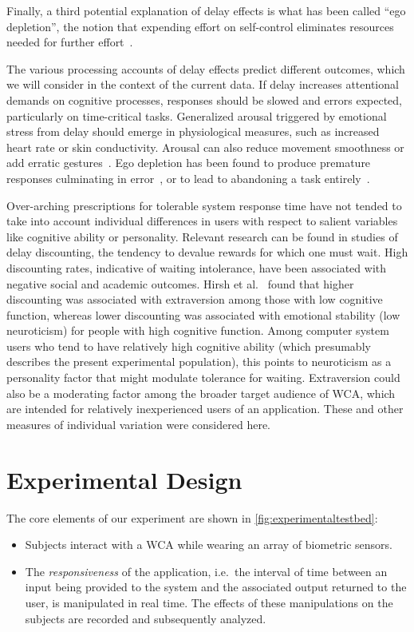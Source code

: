 Finally, a third potential explanation of delay effects is what has been called ``ego depletion'', the notion that expending effort on self-control eliminates resources needed for further effort~\cite{baumeister74tice,lin2020strong}.

The various processing accounts of delay effects predict different outcomes, which we will consider in the context of the current data.
If delay increases attentional demands on cognitive processes, responses should be slowed and errors expected, particularly on time-critical tasks.
Generalized arousal triggered by emotional stress from delay should emerge in physiological measures, such as increased heart rate or skin conductivity.
Arousal can also reduce movement smoothness or add erratic gestures~\cite{pijpers2003anxiety}.
Ego depletion has been found to produce premature responses culminating in error~\cite{lin2020strong}, or to lead to abandoning a task entirely~\cite{baumeister74tice}. 

Over-arching prescriptions for tolerable system response time have not tended to take into account individual differences in users with respect to salient variables like cognitive ability or personality. 
Relevant research can be found in studies of delay discounting, the tendency to devalue rewards for which one must wait.
High discounting rates, indicative of waiting intolerance, have been associated with negative social and academic outcomes.
Hirsh et al.~\cite{hirsh2008delay} found that higher discounting was associated with extraversion among those with low cognitive function, whereas lower discounting was associated with emotional stability (low neuroticism) for people with high cognitive function.
Among computer system users who tend to have relatively high cognitive ability (which presumably describes the present experimental population), this points to neuroticism as a personality factor that might modulate tolerance for waiting. Extraversion could also  be  a moderating factor among the broader target audience of WCA, which are intended for relatively inexperienced users of an application.
These and other measures of individual variation were considered here.

\section{Experimental Design}\label{sec:experimentaldesign}

The core elements of our experiment are shown in \cref{fig:experimentaltestbed}:
\begin{itemize}
    \item Subjects interact with a WCA while wearing an array of biometric sensors.
    \item The \emph{responsiveness} of the application, i.e.\ the interval of time between an input being provided to the system and the associated output returned to the user, is manipulated in real time. 
    The effects of these manipulations on the subjects are recorded and subsequently analyzed.    
\end{itemize}

